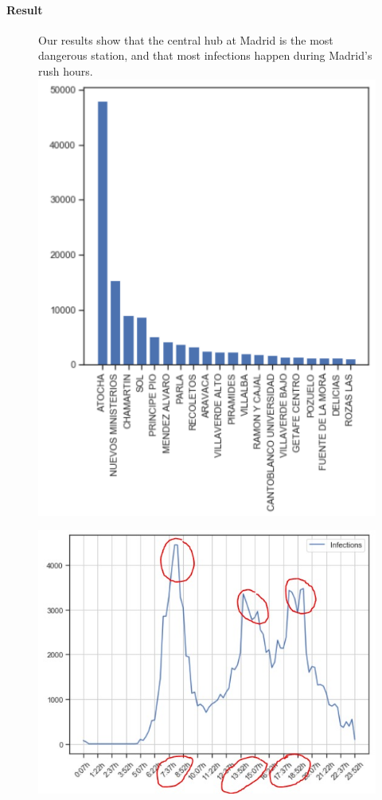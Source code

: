 \documentclass[12pt, a4, epsf] {article}
\theoremstyle{plain}
\theoremstyle{definition}
\begin{document}
\paragraph{Result}
\begin{figure}[htbp]
Our results show that the central hub at Madrid is the most dangerous station, and that most infections happen during Madrid's rush hours.
\includegraphics[width=0.8\linewidth]{Scratch_Visuals/madrid-cercanias-stats-top20.png}
\end{figure}
\begin{figure}[htbp]
\includegraphics[width=0.8\linewidth]{Scratch_Visuals/madrid-infection-timeline.jpg}
\end{figure}
\end{document}
